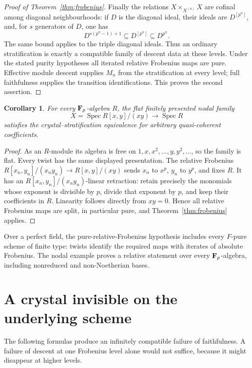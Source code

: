 \documentclass[11pt]{article}
\DeclareMathOperator{\Spec}{Spec}\DeclareMathOperator{\Hom}{Hom}
\newtheorem{corollary}[theorem]{Corollary}
\theoremstyle{definition}\newtheorem{definition}[theorem]{Definition}
\theoremstyle{remark}\newtheorem{remark}[theorem]{Remark}
\begin{document}
\begin{proof}[Proof of Theorem~\ref{thm:frobenius}]
Finally the relations $X\times_{X^{(n)}}X$ are cofinal among diagonal neighbourhoods: if $D$ is the diagonal ideal, their ideals are $D^{[p^n]}$, and, for $s$ generators of $D$, one has
\[D^{s(p^n-1)+1}\subseteq D^{[p^n]}\subseteq D^{p^n}.\]
The same bound applies to the triple diagonal ideals. Thus an ordinary stratification is exactly a compatible family of descent data at these levels.  Under the stated purity hypotheses all iterated relative Frobenius maps are pure.  Effective module descent \cite[Theorem~35.4.22, Tag~08WE]{StacksProject} supplies $M_n$ from the stratification at every level; full faithfulness supplies the transition identifications.  This proves the second assertion.
\end{proof}

\begin{corollary}\label{cor:node}
For every $\mathbf F_p$-algebra $R$, the flat finitely presented nodal family
\[
                    X=\Spec R[x,y]/(xy)\longrightarrow\Spec R
\]
satisfies the crystal--stratification equivalence for arbitrary quasi-coherent coefficients.
\end{corollary}
\begin{proof}
As an $R$-module its algebra is free on $1,x,x^2,\ldots,y,y^2,\ldots$, so the family is flat.  Every twist has the same displayed presentation.  The relative Frobenius $R[x_n,y_n]/(x_ny_n)\to R[x,y]/(xy)$ sends $x_n$ to $x^p$, $y_n$ to $y^p$, and fixes $R$.  It has an $R[x_n,y_n]/(x_ny_n)$-linear retraction: retain precisely the monomials whose exponent is divisible by $p$, divide that exponent by $p$, and keep their coefficients in $R$.  Linearity follows directly from $xy=0$.  Hence all relative Frobenius maps are split, in particular pure, and Theorem~\ref{thm:frobenius} applies.
\end{proof}

Over a perfect field, the pure-relative-Frobenius hypothesis includes every $F$-pure scheme of finite type: twists identify the required maps with iterates of absolute Frobenius. The nodal example proves a relative statement over every $\mathbf F_p$-algebra, including nonreduced and non-Noetherian bases.

\section{A crystal invisible on the underlying scheme}

The following formulas produce an infinitely compatible failure of faithfulness. A failure of descent at one Frobenius level alone would not suffice, because it might disappear at higher levels.
\end{document}
